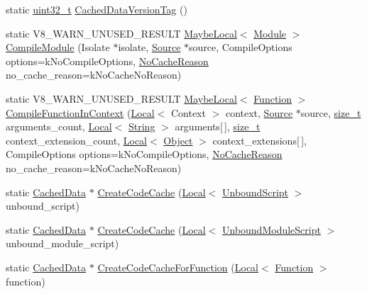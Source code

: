 \begin{DoxyCompactItemize}
\item 
static \mbox{\hyperlink{classuint32__t}{uint32\+\_\+t}} \mbox{\hyperlink{classv8_1_1ScriptCompiler_ab0728cc7751340381f2b660af8c7b35b}{Cached\+Data\+Version\+Tag}} ()
\item 
static V8\+\_\+\+W\+A\+R\+N\+\_\+\+U\+N\+U\+S\+E\+D\+\_\+\+R\+E\+S\+U\+LT \mbox{\hyperlink{classv8_1_1MaybeLocal}{Maybe\+Local}}$<$ \mbox{\hyperlink{classv8_1_1Module}{Module}} $>$ \mbox{\hyperlink{classv8_1_1ScriptCompiler_a3b3aed3622a957a4af4ced80348dcb9e}{Compile\+Module}} (Isolate $\ast$isolate, \mbox{\hyperlink{classv8_1_1ScriptCompiler_1_1Source}{Source}} $\ast$source, Compile\+Options options=k\+No\+Compile\+Options, \mbox{\hyperlink{classv8_1_1ScriptCompiler_a7f13fa15484cfc500ae51927756e0d60}{No\+Cache\+Reason}} no\+\_\+cache\+\_\+reason=k\+No\+Cache\+No\+Reason)
\item 
static V8\+\_\+\+W\+A\+R\+N\+\_\+\+U\+N\+U\+S\+E\+D\+\_\+\+R\+E\+S\+U\+LT \mbox{\hyperlink{classv8_1_1MaybeLocal}{Maybe\+Local}}$<$ \mbox{\hyperlink{classv8_1_1Function}{Function}} $>$ \mbox{\hyperlink{classv8_1_1ScriptCompiler_a376bcde3d0271797d06b672c9c5cf98d}{Compile\+Function\+In\+Context}} (\mbox{\hyperlink{classv8_1_1Local}{Local}}$<$ Context $>$ context, \mbox{\hyperlink{classv8_1_1ScriptCompiler_1_1Source}{Source}} $\ast$source, \mbox{\hyperlink{classsize__t}{size\+\_\+t}} arguments\+\_\+count, \mbox{\hyperlink{classv8_1_1Local}{Local}}$<$ \mbox{\hyperlink{classv8_1_1String}{String}} $>$ arguments\mbox{[}$\,$\mbox{]}, \mbox{\hyperlink{classsize__t}{size\+\_\+t}} context\+\_\+extension\+\_\+count, \mbox{\hyperlink{classv8_1_1Local}{Local}}$<$ \mbox{\hyperlink{classv8_1_1Object}{Object}} $>$ context\+\_\+extensions\mbox{[}$\,$\mbox{]}, Compile\+Options options=k\+No\+Compile\+Options, \mbox{\hyperlink{classv8_1_1ScriptCompiler_a7f13fa15484cfc500ae51927756e0d60}{No\+Cache\+Reason}} no\+\_\+cache\+\_\+reason=k\+No\+Cache\+No\+Reason)
\item 
static \mbox{\hyperlink{structv8_1_1ScriptCompiler_1_1CachedData}{Cached\+Data}} $\ast$ \mbox{\hyperlink{classv8_1_1ScriptCompiler_a1f94625c81c0346c48b21ef1c9c73587}{Create\+Code\+Cache}} (\mbox{\hyperlink{classv8_1_1Local}{Local}}$<$ \mbox{\hyperlink{classv8_1_1UnboundScript}{Unbound\+Script}} $>$ unbound\+\_\+script)
\item 
static \mbox{\hyperlink{structv8_1_1ScriptCompiler_1_1CachedData}{Cached\+Data}} $\ast$ \mbox{\hyperlink{classv8_1_1ScriptCompiler_a5639eedf1af1c8a9456eb5d0a07ddf8a}{Create\+Code\+Cache}} (\mbox{\hyperlink{classv8_1_1Local}{Local}}$<$ \mbox{\hyperlink{classv8_1_1UnboundModuleScript}{Unbound\+Module\+Script}} $>$ unbound\+\_\+module\+\_\+script)
\item 
static \mbox{\hyperlink{structv8_1_1ScriptCompiler_1_1CachedData}{Cached\+Data}} $\ast$ \mbox{\hyperlink{classv8_1_1ScriptCompiler_a1b6b3a5c9cfcd56c8ad359f6befd6e1a}{Create\+Code\+Cache\+For\+Function}} (\mbox{\hyperlink{classv8_1_1Local}{Local}}$<$ \mbox{\hyperlink{classv8_1_1Function}{Function}} $>$ function)
\end{DoxyCompactItemize}


